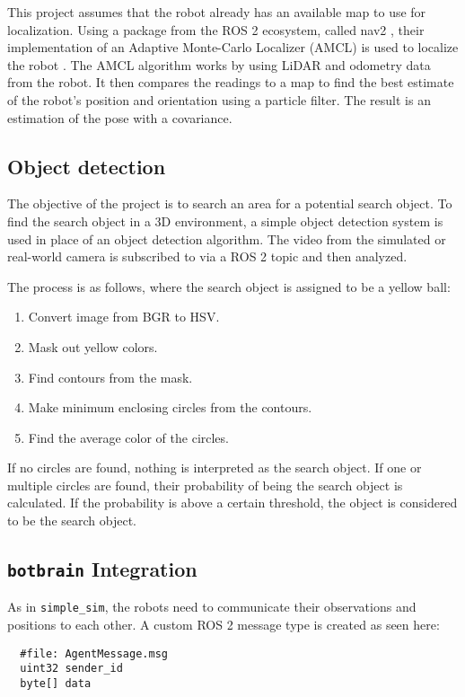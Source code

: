 This project assumes that the robot already has an available map to use for localization.
Using a package from the ROS 2 ecosystem, called nav2 \cite{nav2}, their implementation of an Adaptive Monte-Carlo Localizer (AMCL) is used to localize the robot \cite{amcl}.
The AMCL algorithm works by using LiDAR and odometry data from the robot. It then compares the readings to a map to find the best estimate of the robot's position and orientation using a particle filter. The result is an estimation of the pose with a covariance.

\subsection{Object detection}\label{sub:object_detection}
The objective of the project is to search an area for a potential search object.
To find the search object in a 3D environment, a simple object detection system is used in place of an object detection algorithm. The video from the simulated or real-world camera is subscribed to via a ROS 2 topic and then analyzed.

The process is as follows, where the search object is assigned to be a yellow ball:
\begin{enumerate}
  \item Convert image from BGR to HSV.
  \item Mask out yellow colors.
  \item Find contours from the mask.
  \item Make minimum enclosing circles from the contours.
  \item Find the average color of the circles.
\end{enumerate}

If no circles are found, nothing is interpreted as the search object. If one or multiple circles are found, their probability of being the search object is calculated.
If the probability is above a certain threshold, the object is considered to be the search object.

\subsection{\texttt{botbrain} Integration}\label{sub:Botbrain_integration}
As in \texttt{simple\_sim}, the robots need to communicate their observations and positions to each other. A custom ROS 2 message type is created as seen here:
\begin{verbatim}
  #file: AgentMessage.msg
  uint32 sender_id
  byte[] data
\end{verbatim}

